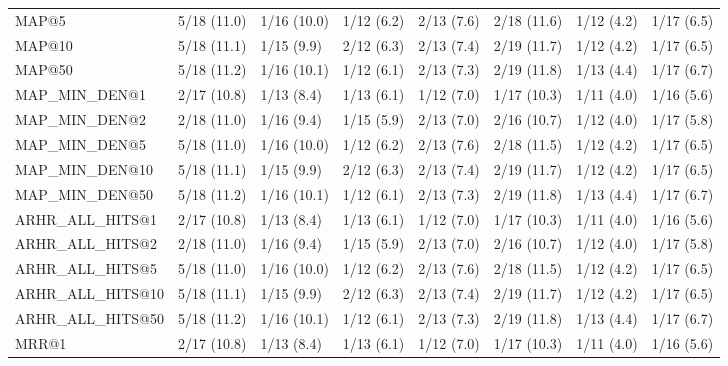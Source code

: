 \begin{tabular}{llllllll}
MAP@5                       &     5/18 (11.0) &      1/16 (10.0) &  1/12 (6.2) &  2/13 (7.6) &  2/18 (11.6) &     1/12 (4.2) &            1/17 (6.5) \\
MAP@10                      &     5/18 (11.1) &       1/15 (9.9) &  2/12 (6.3) &  2/13 (7.4) &  2/19 (11.7) &     1/12 (4.2) &            1/17 (6.5) \\
MAP@50                      &     5/18 (11.2) &      1/16 (10.1) &  1/12 (6.1) &  2/13 (7.3) &  2/19 (11.8) &     1/13 (4.4) &            1/17 (6.7) \\
MAP_MIN_DEN@1               &     2/17 (10.8) &       1/13 (8.4) &  1/13 (6.1) &  1/12 (7.0) &  1/17 (10.3) &     1/11 (4.0) &            1/16 (5.6) \\
MAP_MIN_DEN@2               &     2/18 (11.0) &       1/16 (9.4) &  1/15 (5.9) &  2/13 (7.0) &  2/16 (10.7) &     1/12 (4.0) &            1/17 (5.8) \\
MAP_MIN_DEN@5               &     5/18 (11.0) &      1/16 (10.0) &  1/12 (6.2) &  2/13 (7.6) &  2/18 (11.5) &     1/12 (4.2) &            1/17 (6.5) \\
MAP_MIN_DEN@10              &     5/18 (11.1) &       1/15 (9.9) &  2/12 (6.3) &  2/13 (7.4) &  2/19 (11.7) &     1/12 (4.2) &            1/17 (6.5) \\
MAP_MIN_DEN@50              &     5/18 (11.2) &      1/16 (10.1) &  1/12 (6.1) &  2/13 (7.3) &  2/19 (11.8) &     1/13 (4.4) &            1/17 (6.7) \\
ARHR_ALL_HITS@1             &     2/17 (10.8) &       1/13 (8.4) &  1/13 (6.1) &  1/12 (7.0) &  1/17 (10.3) &     1/11 (4.0) &            1/16 (5.6) \\
ARHR_ALL_HITS@2             &     2/18 (11.0) &       1/16 (9.4) &  1/15 (5.9) &  2/13 (7.0) &  2/16 (10.7) &     1/12 (4.0) &            1/17 (5.8) \\
ARHR_ALL_HITS@5             &     5/18 (11.0) &      1/16 (10.0) &  1/12 (6.2) &  2/13 (7.6) &  2/18 (11.5) &     1/12 (4.2) &            1/17 (6.5) \\
ARHR_ALL_HITS@10            &     5/18 (11.1) &       1/15 (9.9) &  2/12 (6.3) &  2/13 (7.4) &  2/19 (11.7) &     1/12 (4.2) &            1/17 (6.5) \\
ARHR_ALL_HITS@50            &     5/18 (11.2) &      1/16 (10.1) &  1/12 (6.1) &  2/13 (7.3) &  2/19 (11.8) &     1/13 (4.4) &            1/17 (6.7) \\
MRR@1                       &     2/17 (10.8) &       1/13 (8.4) &  1/13 (6.1) &  1/12 (7.0) &  1/17 (10.3) &     1/11 (4.0) &            1/16 (5.6) \\

\end{tabular}
